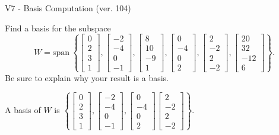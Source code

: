 \begin{exercise}
  \begin{exerciseTitle}V7 - Basis Computation (ver. 104)\end{exerciseTitle}
  \begin{exerciseStatement}
    Find a basis for the subspace 
\[W=\mathrm{span}\ \left\{\left[\begin{array}{r}
0 \\
2 \\
3 \\
1
\end{array}\right] , \left[\begin{array}{r}
-2 \\
-4 \\
0 \\
-1
\end{array}\right] , \left[\begin{array}{r}
8 \\
10 \\
-9 \\
1
\end{array}\right] , \left[\begin{array}{r}
0 \\
-4 \\
0 \\
2
\end{array}\right] , \left[\begin{array}{r}
2 \\
-2 \\
2 \\
-2
\end{array}\right] , \left[\begin{array}{r}
20 \\
32 \\
-12 \\
6
\end{array}\right]\right\}.\]
 Be sure to explain why your result is a basis.


  \end{exerciseStatement}
  \begin{exerciseAnswer}
   A basis of \(W\) is  \(\left\{\left[\begin{array}{r}
0 \\
2 \\
3 \\
1
\end{array}\right] , \left[\begin{array}{r}
-2 \\
-4 \\
0 \\
-1
\end{array}\right] , \left[\begin{array}{r}
0 \\
-4 \\
0 \\
2
\end{array}\right] \left[\begin{array}{r}
2 \\
-2 \\
2 \\
-2
\end{array}\right]\right\}\).
  


  \end{exerciseAnswer}
\end{exercise}